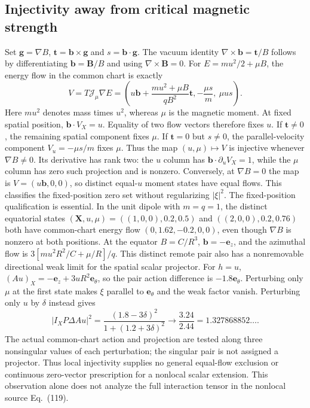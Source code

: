 \documentclass[11pt,letterpaper]{article}
\newcommand{\J}{\mathcal J}
\newcommand{\X}{\mathbf X}
\begin{document}
\subsection*{Injectivity away from critical magnetic strength}
Set $\mathbf g=\nabla B$, $\mathbf t=\mathbf b\times\mathbf g$ and
$s=\mathbf b\cdot\mathbf g$. The vacuum identity
$\nabla\times\mathbf b=\mathbf t/B$ follows by differentiating
$\mathbf b=\mathbf B/B$ and using $\nabla\times\mathbf B=0$.
For $E=mu^2/2+\mu B$, the energy flow in the common chart is exactly
\begin{equation}
 V=T\J_\mu\nabla E=
 \left(u\mathbf b+\frac{mu^2+\mu B}{qB^2}\mathbf t,
       -\frac{\mu s}{m},\ \mu u s\right).
 \label{eq:vacuumflowmap}
\end{equation}
Here $mu^2$ denotes mass times $u^2$, whereas $\mu$ is the magnetic moment.
At fixed spatial position, $\mathbf b\cdot V_X=u$. Equality of two flow
vectors therefore fixes $u$. If $\mathbf t\ne0$, the remaining spatial
component fixes $\mu$. If $\mathbf t=0$ but $s\ne0$, the parallel-velocity
component $V_u=-\mu s/m$ fixes $\mu$. Thus the map $(u,\mu)\mapsto V$ is
injective whenever $\nabla B\ne0$. Its derivative has rank two: the $u$ column
has $\mathbf b\cdot\partial_u V_X=1$, while the $\mu$ column has zero such
projection and is nonzero. Conversely, at $\nabla B=0$ the map is
$V=(u\mathbf b,0,0)$, so distinct equal-$u$ moment states have equal flows.
This classifies the fixed-position zero set without regularizing $|\xi|^2$.
The fixed-position qualification is essential. In the unit dipole with
$m=q=1$, the distinct equatorial states
$(\X,u,\mu)=((1,0,0),0.2,0.5)$ and
$((2,0,0),0.2,0.76)$ both have common-chart energy flow
$(0,1.62,-0.2,0,0)$, even though $\nabla B$ is nonzero at both positions.
At the equator $B=C/R^3$, $\mathbf b=-\mathbf e_z$, and the azimuthal
flow is $3[mu^2R^2/C+\mu/R]/q$. This distinct remote pair also has a nonremovable directional weak limit
for the spatial scalar projector. For $h=u$,
$(Au)_X=-\mathbf e_z+3uR^2\mathbf e_\theta$,
so the pair action difference is $-1.8\mathbf e_\theta$.
Perturbing only $\mu$ at the first state makes $\xi$ parallel to
$\mathbf e_\theta$ and the weak factor vanish. Perturbing only $u$ by
$\delta$ instead gives
\begin{equation}
 \left|I_XP\Delta Au\right|^2
 =\frac{(1.8-3\delta)^2}{1+(1.2+3\delta)^2}
 \longrightarrow\frac{3.24}{2.44}=1.327868852\ldots .
 \label{eq:nonlocaldirectionallimit}
\end{equation}
The actual common-chart action and projection are tested along three
nonsingular values of each perturbation; the singular pair is not assigned
a projector. Thus local injectivity supplies no general equal-flow exclusion
or continuous zero-vector prescription for a nonlocal scalar extension.
This observation alone does not analyze the full interaction tensor in the
nonlocal source Eq.~(119).
\end{document}
